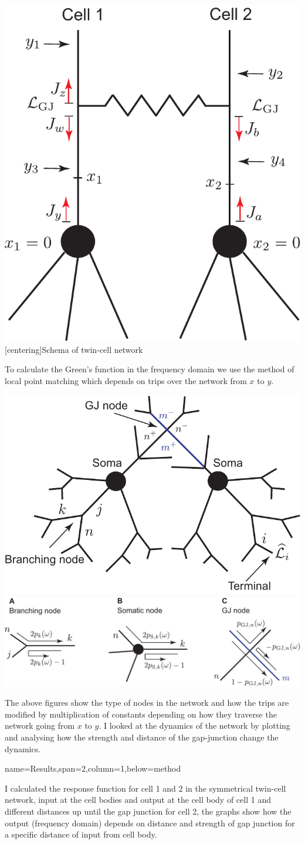 \documentclass[a0paper,portrait]{baposter}
\begin{document}
\begin{poster}
{\begin{center}
	\includegraphics[width=0.25\linewidth]{two_cells-eps-converted-to.pdf}
	[centering]{Schema of twin-cell network}
\end{center}

To calculate the Green's function in the frequency domain we use the method of local point matching which depends on trips over the network from $x$ to $y$.

\vspace{-0.2em}
\begin{center}
	\includegraphics[width=0.36\linewidth]{model-eps-converted-to.pdf}
	\hspace{2em}
	\includegraphics[width=0.55\linewidth]{sum_rules-eps-converted-to.pdf}
\end{center}
\vspace{-0.2em}

The above figures show the type of nodes in the network and how the trips are modified by multiplication of constants depending on how they traverse the network going from $x$ to $y$. I looked at the dynamics of the network by plotting and analysing how the strength and distance of the gap-junction change the dynamics.

}

{name=Results,span=2,column=1,below=method}{
I calculated the response function for cell 1 and 2 in the symmetrical twin-cell network, input at the cell bodies and output at the cell body of cell 1 and different distances up until the gap junction for cell 2, the graphs show how the output (frequency domain) depends on distance and strength of gap junction for a specific distance of input from cell body.

}
\end{poster}
\end{document}
